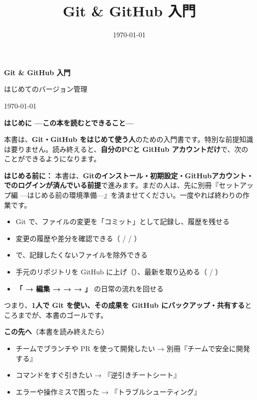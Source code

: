 \documentclass[book, paper=a4, fontsize=10.5pt, titlepage]{jlreq}
\title{Git \& GitHub 入門}
\author{}
\date{\today}
\begin{document}
\begin{titlepage}
  \centering
  \vspace*{4cm}
  {\sffamily\bfseries\Huge Git \& GitHub 入門\par}
  \vspace{1.2cm}
  {\sffamily\Large はじめてのバージョン管理\par}
  \vfill
  {\large \today\par}
\end{titlepage}

\thispagestyle{empty}
\vspace*{1.5cm}
{\sffamily\LARGE\bfseries はじめに —この本を読むとできること—\par}
\vspace{1em}

本書は、\textbf{Git・GitHub をはじめて使う人}のための入門書です。特別な前提知識は要りません。読み終えると、\textbf{自分のPCと GitHub アカウントだけ}で、次のことができるようになります。

\begin{warnbox}
\textbf{はじめる前に：} 本書は、\textbf{Gitのインストール・初期設定・GitHubアカウント・ でのログインが済んでいる前提}で進みます。まだの人は、先に別冊『セットアップ編 —はじめる前の環境準備—』を済ませてください。一度やれば終わりの作業です。
\end{warnbox}

\begin{itemize}[leftmargin=1.6em]
  \item Git で、ファイルの変更を「コミット」として記録し、履歴を残せる
  \item 変更の履歴や差分を確認できる（ /  / ）
  \item {} で、記録したくないファイルを除外できる
  \item 手元のリポジトリを GitHub に上げ（）、最新を取り込める（ / ）
  \item \textbf{「 → 編集 →  →  → 」} の日常の流れを回せる
\end{itemize}

つまり、\textbf{1人で Git を使い、その成果を GitHub にバックアップ・共有する}ところまでが、本書のゴールです。

\begin{hintbox}
\textbf{この先へ}（本書を読み終えたら）
\begin{itemize}[leftmargin=1.4em, nosep]
  \item チームでブランチや PR を使って開発したい → 別冊『チームで安全に開発する』
  \item コマンドをすぐ引きたい → 『逆引きチートシート』
  \item エラーや操作ミスで困った → 『トラブルシューティング』
\end{itemize}
\end{hintbox}

\clearpage

\tableofcontents
\clearpage



\end{document}
